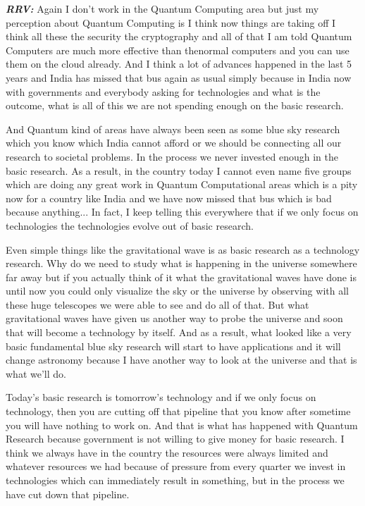 \begin{multicols}{2}
\textbf{\textit{RRV:}} Again I don’t work in the Quantum Computing area but just my perception about Quantum Computing is I think now things are taking off I think all these the security the cryptography and all of that I am told Quantum Computers are much more effective than the\break normal computers and you can use them on the cloud already. And I think a lot of advances happened in the last 5 years and India has missed that bus again as usual simply because in India now with governments and everybody asking for technologies and what is the outcome, what is all of this we are not spending enough on the basic research.

And Quantum kind of areas have always been seen as some blue sky research which you know which India cannot afford or we should be connecting all our research to societal problems. In the process we never invested enough in the basic research. As a result, in the country today I cannot even name five groups which are doing any great work in Quantum Computational areas which is a pity now for a country like India and we have now missed that bus which is bad because anything... In fact, I keep telling this everywhere that if we only focus on technologies the technologies evolve out of basic research.

Even simple things like the gravitational wave is as basic research as a technology research. Why do we need to study what is happening in the universe somewhere far away but if you actually think of it what the gravitational waves have done is until now you could only visualize the sky or the universe by observing with all these huge telescopes we were able to see and do all of that. But what gravitational waves have given us another way to probe the universe and soon that will become a technology by itself. And as a result, what looked like a very basic fundamental blue sky research will start to have applications and it will change astronomy because I have another way to look at the universe and that is what we’ll do.

Today’s basic research is tomorrow’s technology and if we only focus on technology, then you are cutting off that pipeline that you know after sometime you will have nothing to work on. And that is what has happened with Quantum Research because government is not willing to give money for basic research. I think we always have in the country the resources were always limited and whatever resources we had because of pressure from every quarter we invest in technologies which can immediately result in something, but in the process we have cut down that pipeline.


\end{multicols}
